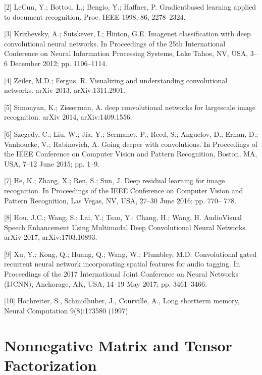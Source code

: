 \documentclass[letterpaper,10pt,english]{jupyterBook}
\begin{document}
\sphinxAtStartPar
{[}2{]} LeCun, Y.; Bottou, L.; Bengio, Y.; Haffner, P. Gradient\sphinxhyphen{}based
learning applied to document recognition. Proc. IEEE 1998, 86,
2278–2324.

\sphinxAtStartPar
{[}3{]} Krizhevsky, A.; Sutskever, I.; Hinton, G.E. Imagenet
classification with deep convolutional neural networks. In Proceedings
of the 25th International Conference on Neural Information Processing
Systems, Lake Tahoe, NV, USA, 3–6 December 2012; pp. 1106–1114.

\sphinxAtStartPar
{[}4{]} Zeiler, M.D.; Fergus, R. Visualizing and understanding
convolutional networks. arXiv 2013, arXiv:1311.2901.

\sphinxAtStartPar
{[}5{]} Simonyan, K.; Zisserman, A. deep convolutional networks for
large\sphinxhyphen{}scale image recognition. arXiv 2014, arXiv:1409.1556.

\sphinxAtStartPar
{[}6{]} Szegedy, C.; Liu, W.; Jia, Y.; Sermanet, P.; Reed, S.; Anguelov,
D.; Erhan, D.; Vanhoucke, V.; Rabinovich, A. Going deeper with
convolutions. In Proceedings of the IEEE Conference on Computer Vision
and Pattern Recognition, Boston, MA, USA, 7–12 June 2015; pp. 1–9.

\sphinxAtStartPar
{[}7{]} He, K.; Zhang, X.; Ren, S.; Sun, J. Deep residual learning for
image recognition. In Proceedings of the IEEE Conference on Computer
Vision and Pattern Recognition, Las Vegas, NV, USA, 27–30 June 2016; pp.
770– 778.

\sphinxAtStartPar
{[}8{]} Hou, J.\sphinxhyphen{}C.; Wang, S.; Lai, Y.; Tsao, Y.; Chang, H.; Wang, H.
Audio\sphinxhyphen{}Visual Speech Enhancement Using Multimodal Deep Convolutional
Neural Networks. arXiv 2017, arXiv:1703.10893.

\sphinxAtStartPar
{[}9{]} Xu, Y.; Kong, Q.; Huang, Q.; Wang, W.; Plumbley, M.D.
Convolutional gated recurrent neural network incorporating spatial
features for audio tagging. In Proceedings of the 2017 International
Joint Conference on Neural Networks (IJCNN), Anchorage, AK, USA, 14–19
May 2017; pp. 3461–3466.

\sphinxAtStartPar
{[}10{]} Hochreiter, S., Schmidhuber, J., Courville, A., Long short\sphinxhyphen{}term
memory, Neural Computation 9(8):1735\sphinxhyphen{}80 (1997)

\sphinxstepscope


\section{Non\sphinxhyphen{}negative Matrix and Tensor Factorization}
\label{\detokenize{Modelling/Non-negative_Matrix_and_Tensor_Factorization:non-negative-matrix-and-tensor-factorization}}\label{\detokenize{Modelling/Non-negative_Matrix_and_Tensor_Factorization::doc}}
\end{document}
